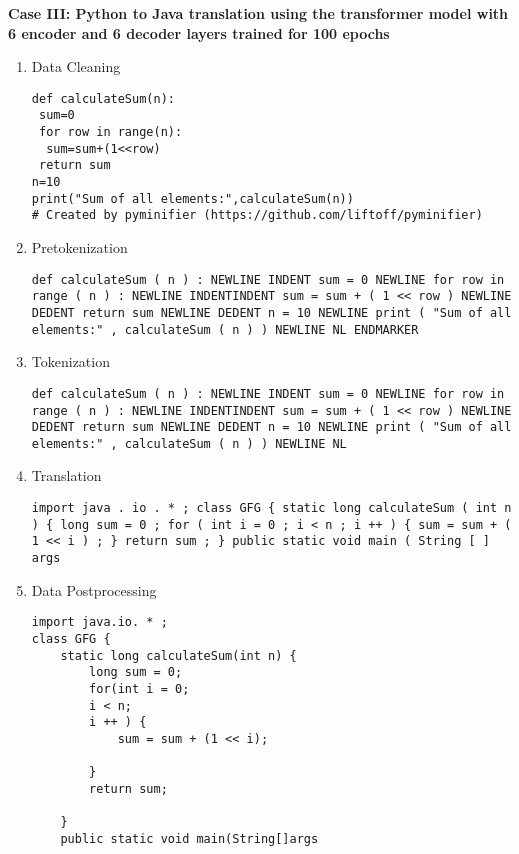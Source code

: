 \textbf{Case III: Python to Java translation using the transformer model with 6 encoder and 6 decoder layers trained for 100 epochs }
\begin{enumerate}[topsep = 0pt, label = \roman*.]
\item Data Cleaning \\
\vspace*{-\baselineskip}
\begin{Verbatim}[frame=single, breaklines=true, breakanywhere=true]
def calculateSum(n):
 sum=0
 for row in range(n):
  sum=sum+(1<<row)
 return sum
n=10
print("Sum of all elements:",calculateSum(n))
# Created by pyminifier (https://github.com/liftoff/pyminifier)
\end{Verbatim}

\item Pretokenization \\
\vspace*{-\baselineskip}
\begin{Verbatim}[frame=single, breaklines=true, breakanywhere=true]
def calculateSum ( n ) : NEWLINE INDENT sum = 0 NEWLINE for row in range ( n ) : NEWLINE INDENTINDENT sum = sum + ( 1 << row ) NEWLINE DEDENT return sum NEWLINE DEDENT n = 10 NEWLINE print ( "Sum of all elements:" , calculateSum ( n ) ) NEWLINE NL ENDMARKER
\end{Verbatim}

\item Tokenization \\
\vspace*{-\baselineskip}
\begin{Verbatim}[frame=single, breaklines=true, breakanywhere=true]
def calculateSum ( n ) : NEWLINE INDENT sum = 0 NEWLINE for row in range ( n ) : NEWLINE INDENTINDENT sum = sum + ( 1 << row ) NEWLINE DEDENT return sum NEWLINE DEDENT n = 10 NEWLINE print ( "Sum of all elements:" , calculateSum ( n ) ) NEWLINE NL 
\end{Verbatim}
\newpage
\item Translation \\
\vspace*{-\baselineskip}
\begin{Verbatim}[frame=single, breaklines=true, breakanywhere=true]
import java . io . * ; class GFG { static long calculateSum ( int n ) { long sum = 0 ; for ( int i = 0 ; i < n ; i ++ ) { sum = sum + ( 1 << i ) ; } return sum ; } public static void main ( String [ ] args
\end{Verbatim}

\item Data Postprocessing \\
\vspace*{-\baselineskip}
\begin{Verbatim}[frame=single, breaklines=true, breakanywhere=true]
import java.io. * ;
class GFG {
    static long calculateSum(int n) {
        long sum = 0;
        for(int i = 0;
        i < n;
        i ++ ) {
            sum = sum + (1 << i);
            
        }
        return sum;
        
    }
    public static void main(String[]args
\end{Verbatim}
\end{enumerate}

